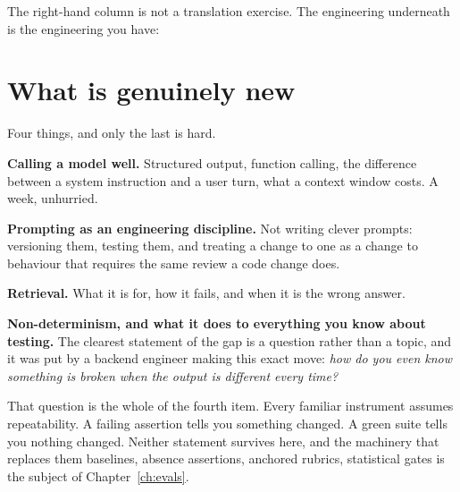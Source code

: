 The right-hand column is not a translation exercise. The engineering underneath
is the engineering you have: 


\section{What is genuinely new}

Four things, and only the last is hard.

\textbf{Calling a model well.} Structured output, function calling, the
difference between a system instruction and a user turn, what a context window
costs. A week, unhurried.

\textbf{Prompting as an engineering discipline.} Not writing clever prompts:
versioning them, testing them, and treating a change to one as a change to
behaviour that requires the same review a code change does.

\textbf{Retrieval.} What it is for, how it fails, and when it is the wrong
answer.

\textbf{Non-determinism, and what it does to everything you know about
testing.} The clearest statement of the gap is a question rather than a topic,
and it was put by a backend engineer making this exact move: \emph{how do you
even know something is broken when the output is different every
time?}

That question is the whole of the fourth item. Every familiar instrument
assumes repeatability. A failing assertion tells you something changed. A green
suite tells you nothing changed. Neither statement survives here, and the
machinery that replaces them \dash{} baselines, absence assertions, anchored
rubrics, statistical gates \dash{} is the subject of Chapter~\ref{ch:evals}.

 

